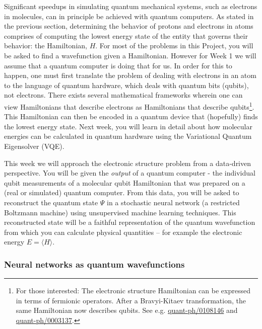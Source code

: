 \documentclass[12pt]{article}
\begin{document}
Significant speedups in simulating quantum mechanical systems, such as electrons in molecules, can in principle be achieved with quantum computers. 
As stated in the previous section, determining the behavior of protons and electrons in atoms comprises of computing the lowest energy state of the entity that governs their behavior: the Hamiltonian, $H$. 
For most of the problems in this Project, you will be asked to find a wavefunction given a Hamiltonian.  However for Week 1 we will assume that a quantum
computer is doing that for us.  In order for this to happen, one must first translate the problem of dealing with electrons in an atom to 
the language of quantum hardware, which deals with quantum bits (qubits), not electrons. 
There exists several mathematical frameworks wherein one can view Hamiltonians that describe electrons as Hamiltonians that describe qubits\footnote{For those interested: The electronic structure Hamiltonian can be expressed in terms of fermionic operators. After a Bravyi-Kitaev transformation, the same Hamiltonian now describes qubits. See e.g. \href{https://arxiv.org/abs/quant-ph/0108146}{quant-ph/0108146} and \href{https://arxiv.org/abs/quant-ph/0003137}{quant-ph/0003137}.}.
This Hamiltonian can then be encoded in a quantum device that (hopefully) finds the lowest energy state.
Next week, you will learn in detail about how molecular energies can be calculated in quantum hardware using 
the Variational Quantum Eigensolver (VQE).

This week we will approach the electronic structure problem from a data-driven perspective.  
You will be given the {\it output} of a quantum computer - the individual qubit measurements of a molecular qubit Hamiltonian that was prepared
on a (real or simulated) quantum computer. 
From this data, you will be asked to reconstruct the quantum state $\Psi$ in a stochastic neural network 
(a restricted Boltzmann machine) using unsupervised machine learning techniques.  
This reconstructed state will be a faithful representation of the quantum wavefunction from which you can calculate physical quantities -- for example the electronic energy $E = \langle H \rangle$.

\subsubsection{Neural networks as quantum wavefunctions}
\end{document}
